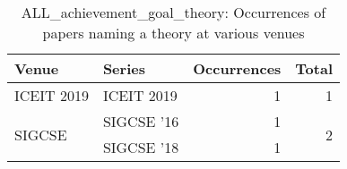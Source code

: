 \begin{table*}[t]
\begin{tabular}{llrr}
Venue & Series & Occurrences & Total\\\hline
\multirow{1}{*}{ICEIT 2019} & ICEIT 2019 & 1 & \multirow{1}{*}{1}\\
\multirow{2}{*}{SIGCSE } & SIGCSE '16 & 1 & \multirow{2}{*}{2}\\
& SIGCSE '18 & 1 &\\
\end{tabular}
\caption{ALL\_achievement\_goal\_theory: Occurrences of papers naming a theory at various venues}
\end{table*}
